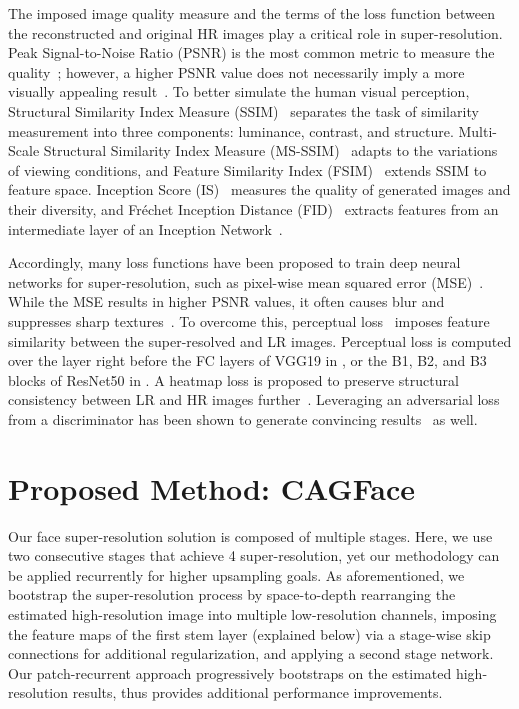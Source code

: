 \documentclass[10pt,twocolumn,letterpaper]{article}
\begin{document}
The imposed image quality measure and the terms of the loss function between the reconstructed and original HR images play a critical role in super-resolution. Peak Signal-to-Noise Ratio (PSNR) is the most common metric to measure the quality~\cite{hore2010image}; however, a higher PSNR value does not necessarily imply a more visually appealing result~\cite{wang2009mean}. To better simulate the human visual perception, Structural Similarity Index Measure (SSIM)~\cite{wang2002universal} separates the task of similarity measurement into three components: luminance, contrast, and structure. Multi-Scale Structural Similarity Index Measure (MS-SSIM)~\cite{wang2003multiscale} adapts to the variations of viewing conditions, and Feature Similarity Index (FSIM)~\cite{zhang2011fsim} extends SSIM to feature space. Inception Score (IS)~\cite{salimans2016improved} measures the quality of generated images and their diversity, and Fr\'echet Inception Distance (FID)~\cite{heusel2017gans} extracts features from an intermediate layer of an Inception Network~\cite{szegedy2016rethinking}. 

Accordingly, many loss functions have been proposed to train deep neural networks for super-resolution, such as pixel-wise mean squared error (MSE)~\cite{van2006image}. While the MSE results in higher PSNR values, it often causes blur and suppresses sharp textures~\cite{wang2009mean}. To overcome this,  perceptual loss~\cite{johnson2016perceptual} imposes feature similarity between the super-resolved and LR images. Perceptual loss is computed over the layer right before the FC layers of VGG19 in \cite{ledig2017photo}, or the B1, B2, and B3 blocks of ResNet50 in \cite{bulat2018super}. A heatmap loss is proposed to preserve structural consistency between LR and HR images further~\cite{bulat2018super}. Leveraging an adversarial loss from a discriminator has been shown to generate convincing results~\cite{ledig2017photo,wang2018esrgan,nah2019ntire} as well.

 
\section{Proposed Method: CAGFace}\label{sec:method}

Our face super-resolution solution is composed of multiple stages. Here, we use two consecutive stages that achieve 4 super-resolution, yet our methodology can be applied recurrently for higher upsampling goals. As aforementioned, we bootstrap the super-resolution process by space-to-depth rearranging the estimated high-resolution image into multiple low-resolution channels, imposing the feature maps of the first stem layer (explained below) via a stage-wise skip connections for additional regularization, and applying a second stage network. Our patch-recurrent approach progressively bootstraps on the estimated high-resolution results, thus provides additional performance improvements. 
\end{document}
